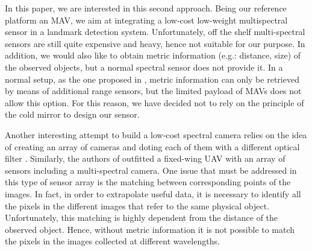 \documentclass[letterpaper, 10pt, conference]{ieeeconf}      %
\begin{document}
In this paper, we are interested in this second approach. %
Being our reference platform an MAV, we aim at integrating a low-cost low-weight multispectral sensor in a landmark detection system.
Unfortunately, off the shelf multi-spectral sensors are still quite expensive and heavy, hence not suitable for our purpose.
In addition, we would also like to obtain metric information (e.g.: distance, size) of the observed objects, but a normal spectral sensor does not provide it.
In a normal setup, as the one proposed in \cite{2007_BrUnBa}, metric information can only be retrieved by means of additional range sensors, but the limited payload of MAVs does not allow this option.
For this reason, we have decided not to rely on the principle of the cold mirror to design our sensor.

Another interesting attempt to build a low-cost spectral camera relies on the idea of creating an array of cameras and doting each of them with a different optical filter \cite{2012_DoMuHa}.
Similarly, the authors of \cite{2007_LRBLM} outfitted a fixed-wing UAV with an array of sensors including a multi-spectral camera.
One issue that must be addressed in this type of sensor array is the matching between corresponding points of the images.
In fact, in order to extrapolate useful data, it is necessary to identify all the pixels in the different images that refer to the same physical object.
Unfortunately, this matching is highly dependent from the distance of the observed object.
Hence, without metric information it is not possible to match the pixels in the images collected at different wavelengths.



%
%
\end{document}
